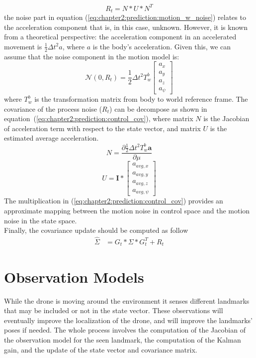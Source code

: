\begin{equation}
    R_t = N * U * N^T
    \label{eq:chapter2:prediction:control_cov}
\end{equation}
the noise part in equation (\ref{eq:chapter2:prediction:motion_w_noise}) relates to the acceleration component that is, in this case, unknown. However, it is known from a theoretical perspective: the acceleration component in an accelerated movement is $\frac{1}{2}\Delta t^2 a$, where $a$ is the body's acceleration. Given this, we can assume that the noise component in the motion model is:
\begin{equation}
    \mathcal{N}\left(0, R_t\right) = \frac{1}{2} \Delta t^2 T_w^b \begin{bmatrix}
        a_x \\ a_y \\ a_z \\ a_{\psi}
    \end{bmatrix}
\end{equation}
where $T_w^b$ is the transformation matrix from body to world reference frame. The covariance of the process noise ($R_t$) can be decompose as shown in equation~(\ref{eq:chapter2:prediction:control_cov}), where matrix $N$ is the Jacobian of acceleration term  with respect to the state vector, and matrix $U$ is the estimated average acceleration.
\begin{equation}
    N = \frac{\partial \frac{1}{2} \Delta t^2 T_w^b \textbf{a}}{\partial \mu}
\end{equation}
\begin{equation}
    U = \textbf{I} * \begin{bmatrix}
        a_{avg, x} \\ a_{avg, y} \\ a_{avg, z} \\ a_{avg, \psi}
    \end{bmatrix}
\end{equation}
The multiplication in (\ref{eq:chapter2:prediction:control_cov}) provides an approximate mapping between the motion noise in control space and the motion noise in the state space.\\

Finally, the covariance update should be computed as follow
\begin{align}
    \hat\Sigma &= G_t * \Sigma * G_t^T + R_t
\end{align}

\section{Observation Models}
\label{sec:chapter2:correction}
While the drone is moving around the environment it senses different landmarks that may be included or not in the state vector. These observations will eventually improve the localization of the drone, and will improve the landmarks' poses if needed. The whole process involves the computation of the Jacobian of the observation model for the seen landmark, the computation of the Kalman gain, and the update of the state vector and covariance matrix.\\

